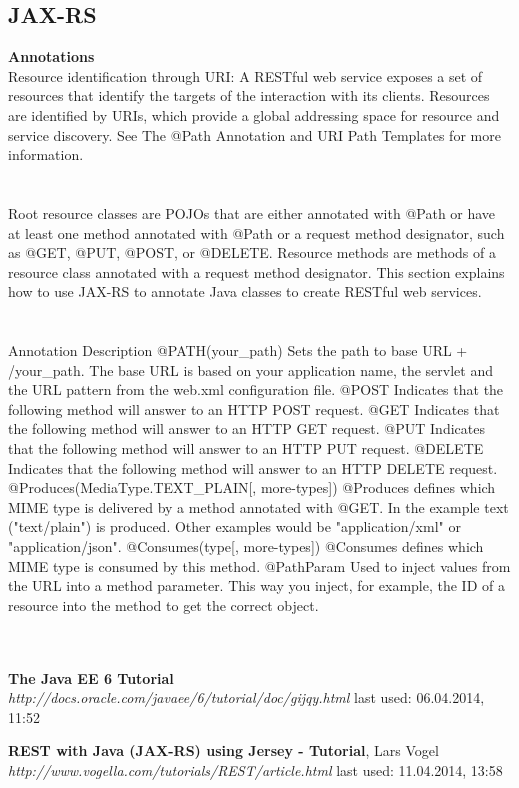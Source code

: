 \documentclass[12pt]{article}
\begin{document}
\subsection{JAX-RS}
\textbf{Annotations}\\
Resource identification through URI: A RESTful web service exposes a set of resources that identify the targets of the interaction with its clients. Resources are identified by URIs, which provide a global addressing space for resource and service discovery. See The @Path Annotation and URI Path Templates for more information.
\\ \\ \\
Root resource classes are POJOs that are either annotated with @Path or have at least one method annotated with @Path or a request method designator, such as @GET, @PUT, @POST, or @DELETE. Resource methods are methods of a resource class annotated with a request method designator. This section explains how to use JAX-RS to annotate Java classes to create RESTful web services.\cite{javaEE6}
\\ \\ \\
Annotation	Description
@PATH(your_path)	Sets the path to base URL + /your_path. The base URL is based on your application name, the servlet and the URL pattern from the web.xml configuration file.
@POST	Indicates that the following method will answer to an HTTP POST request.
@GET	Indicates that the following method will answer to an HTTP GET request.
@PUT	Indicates that the following method will answer to an HTTP PUT request.
@DELETE	Indicates that the following method will answer to an HTTP DELETE request.
@Produces(MediaType.TEXT_PLAIN[, more-types])	@Produces defines which MIME type is delivered by a method annotated with @GET. In the example text ("text/plain") is produced. Other examples would be "application/xml" or "application/json".
@Consumes(type[, more-types])	@Consumes defines which MIME type is consumed by this method.
@PathParam	Used to inject values from the URL into a method parameter. This way you inject, for example, the ID of a resource into the method to get the correct object.
\\ \\ \\


\newpage
\begin{thebibliography}{56}

   \textbf{The Java EE 6 Tutorial} \\
  \textit{http://docs.oracle.com/javaee/6/tutorial/doc/gijqy.html}
  \newline last used: 06.04.2014, 11:52
  
   \textbf{REST with Java (JAX-RS) using Jersey - Tutorial}, Lars Vogel\\
  \textit{  http://www.vogella.com/tutorials/REST/article.html}
  \newline last used: 11.04.2014, 13:58
\end{thebibliography}
\end{document}
